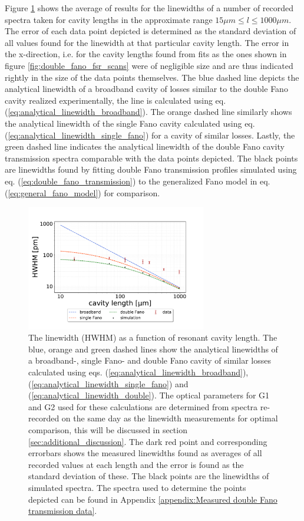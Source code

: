 Figure \ref{fig:HWHM_vs_l_double_fano_result} shows the average of results for the linewidths of a number of recorded spectra taken for cavity lengths in the approximate range $15 \mu m \leq l \leq 1000 \mu m$. The error of each data point depicted is determined as the standard deviation of all values found for the linewidth at that particular cavity length. The error in the x-direction, i.e. for the cavity lengths found from fits as the ones shown in figure \ref{fig:double_fano_fsr_scans} were of negligible size and are thus indicated rightly in the size of the data points themselves. The blue dashed line depicts the analytical linewidth of a broadband cavity of losses similar to the double Fano cavity realized experimentally, the line is calculated using eq. (\ref{eq:analytical_linewidth_broadband}). The orange dashed line similarly shows the analytical linewidth of the single Fano cavity calculated using eq. (\ref{eq:analytical_linewidth_single_fano}) for a cavity of similar losses. Lastly, the green dashed line indicates the analytical linewidth of the double Fano cavity transmission spectra comparable with the data points depicted. The black points are linewidths found by fitting double Fano transmission profiles simulated using eq. (\ref{eq:double_fano_transmission}) to the generalized Fano model in eq. (\ref{eq:general_fano_model}) for comparison.

\begin{figure}[h!]
    \centering
    \includegraphics[width=0.7\textwidth]{figures/results/double fano fits/HWHM_vs_cavity_length_result.pdf}
    \caption{The linewidth (HWHM) as a function of resonant cavity length. The blue, orange and green dashed lines show the analytical linewidths of a broadband-, single Fano- and double Fano cavity of similar losses calculated using eqs. (\ref{eq:analytical_linewidth_broadband}), (\ref{eq:analytical_linewidth_single_fano}) and (\ref{eq:analytical_linewidth_double}). The optical parameters for G1 and G2 used for these calculations are determined from spectra re-recorded on the same day as the linewidth measurements for optimal comparison, this will be discussed in section \ref{sec:additional_discussion}. The dark red point and corresponding errorbars shows the measured linewidths found as averages of all recorded values at each length and the error is found as the standard deviation of these. The black points are the linewidths of simulated spectra. The spectra used to determine the points depicted can be found in Appendix \ref{appendix:Measured double Fano transmission data}.}
    \label{fig:HWHM_vs_l_double_fano_result}
\end{figure}

